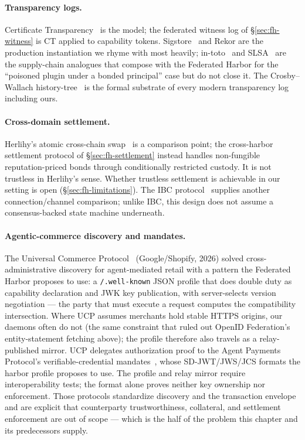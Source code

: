 \documentclass[11pt,a4paper]{article}
\theoremstyle{definition}
\theoremstyle{remark}
\begin{document}
\paragraph{Transparency logs.} Certificate Transparency~ is the model; the federated witness log of \S\ref{sec:fh-witness} is CT applied to capability tokens. Sigstore~ and Rekor are the production instantiation we rhyme with most heavily; in-toto~ and SLSA~ are the supply-chain analogues that compose with the Federated Harbor for the ``poisoned plugin under a bonded principal'' case but do not close it. The Crosby--Wallach history-tree~ is the formal substrate of every modern transparency log including ours.

\paragraph{Cross-domain settlement.} Herlihy's atomic cross-chain swap~ is a comparison point; the cross-harbor settlement protocol of \S\ref{sec:fh-settlement} instead handles non-fungible reputation-priced bonds through conditionally restricted custody. It is not trustless in Herlihy's sense. Whether trustless settlement is achievable in our setting is open (\S\ref{sec:fh-limitations}). The IBC protocol~ supplies another connection/channel comparison; unlike IBC, this design does not assume a consensus-backed state machine underneath.

\paragraph{Agentic-commerce discovery and mandates.} The Universal Commerce
Protocol~ (Google/Shopify, 2026) solved cross-administrative
discovery for agent-mediated retail with a pattern the Federated Harbor
proposes to use: a \texttt{/.well-known} JSON profile that does
double duty as capability declaration and JWK key publication, with
server-selects version negotiation --- the party that must execute a request
computes the compatibility intersection. Where UCP assumes merchants hold
stable HTTPS origins, our daemons often do not (the same constraint that
ruled out OpenID Federation's entity-statement fetching above); the profile
therefore also travels as a relay-published mirror. UCP delegates
authorization proof to the Agent Payments Protocol's verifiable-credential
mandates~, whose SD-JWT/JWS/JCS formats the harbor
profile proposes to use. The profile and relay mirror require interoperability tests; the format alone proves neither key ownership nor enforcement. Those
protocols standardize discovery and the transaction envelope and are
explicit that counterparty trustworthiness, collateral, and settlement
enforcement are out of scope --- which is the half of the problem this chapter
and its predecessors supply.
\end{document}
